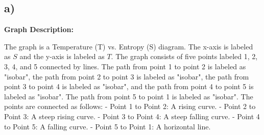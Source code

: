 

\subsection*{a)}

\begin{center}
\textbf{Graph Description:}
\end{center}

The graph is a Temperature (T) vs. Entropy (S) diagram. The x-axis is labeled as $S$ and the y-axis is labeled as $T$. The graph consists of five points labeled 1, 2, 3, 4, and 5 connected by lines. The path from point 1 to point 2 is labeled as "isobar", the path from point 2 to point 3 is labeled as "isobar", the path from point 3 to point 4 is labeled as "isobar", and the path from point 4 to point 5 is labeled as "isobar". The path from point 5 to point 1 is labeled as "isobar". The points are connected as follows:
- Point 1 to Point 2: A rising curve.
- Point 2 to Point 3: A steep rising curve.
- Point 3 to Point 4: A steep falling curve.
- Point 4 to Point 5: A falling curve.
- Point 5 to Point 1: A horizontal line.